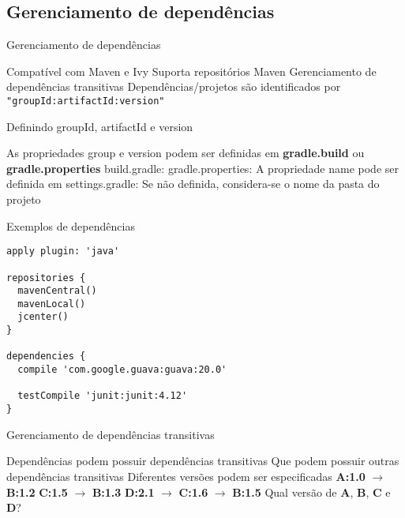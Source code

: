 \documentclass{beamer}
\begin{document}
\subsection{Gerenciamento de dependências}

\begin{frame}{Gerenciamento de dependências}
 \begin{outline}
    Compatível com Maven e Ivy
     \2 Suporta repositórios Maven
    Gerenciamento de dependências transitivas
    Dependências/projetos são identificados por \texttt{"groupId:artifactId:version"}
 \end{outline}
\end{frame}

\begin{frame}{Definindo groupId, artifactId e version}
 \begin{outline}
    As propriedades \alert{group} e \alert{version} podem ser definidas em \textbf{gradle.build} ou \textbf{gradle.properties}
     build.gradle:
     \3
     gradle.properties:
     \3
    A propriedade \alert{name} pode ser definida em settings.gradle:
    \2
     Se não definida, considera-se o nome da pasta do projeto
 \end{outline}
\end{frame}

\begin{frame}[fragile]{Exemplos de dependências}
 \begin{verbatim}
apply plugin: 'java'

repositories {
  mavenCentral()
  mavenLocal()
  jcenter()
}

dependencies {
  compile 'com.google.guava:guava:20.0'
  
  testCompile 'junit:junit:4.12'
}
 \end{verbatim}
\end{frame}


\begin{frame}{Gerenciamento de dependências transitivas}
 \begin{outline}
    Dependências podem possuir dependências transitivas
     Que podem possuir outras dependências transitivas
    Diferentes versões podem ser especificadas
    \2 \textbf{A:1.0} $\rightarrow$ \textbf{B:1.2}
    \2 \textbf{C:1.5} $\rightarrow$ \textbf{B:1.3}
    \2 \textbf{D:2.1} $\rightarrow$ \textbf{C:1.6} $\rightarrow$ \textbf{B:1.5}
     Qual versão de \textbf{A}, \textbf{B}, \textbf{C} e \textbf{D}?
 \end{outline}
\end{frame}
\end{document}
